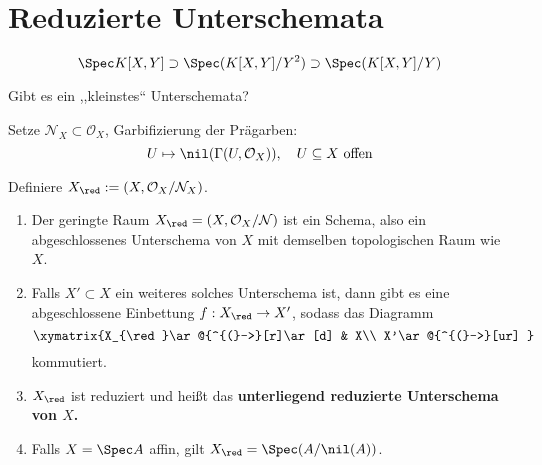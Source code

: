 \section{Reduzierte Unterschemata}

\[
  \Spec K[X,Y]\supset\Spec(K[X,Y]/Y^{2})\supset\Spec(K[X,Y]/Y)
\]

\begin{question*}
  Gibt es ein ,,kleinstes`` Unterschemata?
\end{question*}
Setze $\mathcal{N}_{X}\subset\mathcal{O}_{X}$, Garbifizierung der
Prägarben:
\[
  U\mapsto\nil(\Gamma(U,\mathcal{O}_{X})),\quad U\subseteq X\text{ offen}
\]

Definiere $X_{\red}:=(X,\mathcal{O}_{X}/\mathcal{N}_{X})$.

\begin{prop}[44]
  \mbox{}
  \begin{enumerate}
  \item Der geringte Raum $X_{\red}=(X,\mathcal{O}_{X}/\mathcal{N})$ ist
    ein Schema, also ein abgeschlossenes Unterschema von $X$ mit demselben
    topologischen Raum wie $X$.
  \item Falls $X'\subset X$ ein weiteres solches Unterschema ist, dann gibt
    es eine abgeschlossene Einbettung $f:X_{\red}\rightarrow X'$, sodass
    das Diagramm
    \[
      \xymatrix{X_{\red}\ar@{^{(}->}[r]\ar[d] & X\\
        X'\ar@{^{(}->}[ur]
      }
    \]
    kommutiert.
  \item $X_{\red}$ ist reduziert und heißt das \textbf{unterliegend reduzierte
      Unterschema von $X$.}
  \item Falls $X=\Spec A$ affin, gilt $X_{\red}=\Spec(A/\nil(A))$.
  \end{enumerate}
\end{prop}

